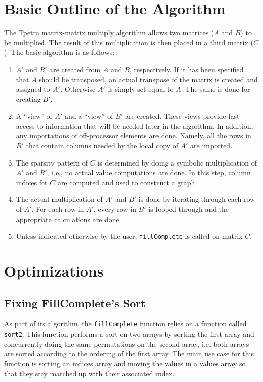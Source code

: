 \documentclass[pdf,12pt]{SANDreport}
\newcommand{\Aprime}{\ensuremath{A'}\xspace}
\newcommand{\Bprime}{\ensuremath{B'}\xspace}
\begin{document}
\section{Basic Outline of the Algorithm}
The Tpetra matrix-matrix multiply algorithm allows two matrices ($A$ and $B$) to be multiplied. The result of this 
multiplication is then placed in a third matrix ($C$).
The basic algorithm is as follows:
\begin{enumerate}
  \item \Aprime and \Bprime are created from $A$ and $B$, respectively. If it has been specified that $A$ should be 
  transposed, an actual 
  transpose of the matrix is created and assigned to \Aprime. Otherwise \Aprime is simply set equal to $A$. The same is 
  done for creating \Bprime.
  \item A ``view'' of \Aprime and a ``view'' of \Bprime are created. These views provide fast access to information that 
  will be needed later in the algorithm. In addition, any importations of off-processor elements are done. Namely, all the 
  rows in \Bprime that contain columns needed by the local copy of \Aprime are imported.
  \item The sparsity pattern of $C$ is determined by doing a symbolic multiplication of \Aprime and \Bprime, i.e., no actual
  value computations are done. In this step, column indices for $C$ are computed and used to construct a graph.
  \item The actual multiplication of \Aprime and \Bprime is done by iterating through each row of \Aprime. For each row in 
  \Aprime, every row in \Bprime is looped through and the appropriate calculations are done.
  \item Unless indicated otherwise by the user, \verb!fillComplete! is called on matrix $C$.
\end{enumerate}

\section{Optimizations}

\subsection{Fixing FillComplete's Sort}
As part of its algorithm, the \verb!fillComplete! function relies on a function called \verb!sort2!. This function performs 
a sort on two arrays by sorting the first array and concurrently doing the same permutations on the second array, 
i.e. both arrays are sorted according to the ordering of the first array. The main use case for this function is sorting 
an indices array and moving the values in a values array so that they stay matched up with their associated index.
\end{document}
